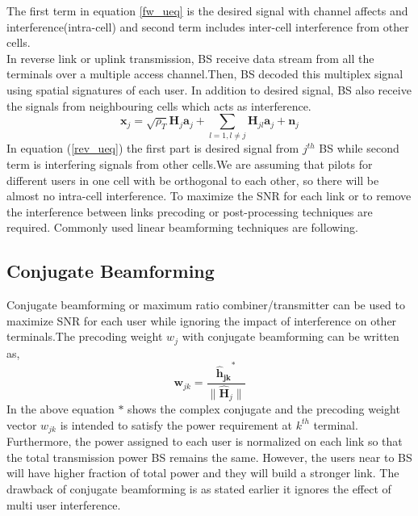  The first term in equation \ref{fw_ueq} is the desired signal with channel affects and interference(intra-cell) and second term includes inter-cell interference from other cells.\\
 In reverse link or uplink transmission, BS receive data stream from all the terminals over a multiple access channel.Then, BS decoded this multiplex signal using  spatial signatures of each user. In addition to desired signal, BS also receive the signals from neighbouring cells which acts as interference.
 \begin{equation}
    \mathbf{x}_j=\sqrt{\rho_T}\mathbf{H}_j \mathbf{a}_j+\sum_{l=1,l\neq j} \mathbf{H}_{jl} \mathbf{a}_j+\mathbf{n}_j
    \label{rev_ueq}
 \end{equation}
 In equation (\ref{rev_ueq}) the first part is desired signal from $j^{th}$ BS while second term is interfering signals from other cells.We are assuming that pilots for different users in one cell with be orthogonal to each other, so there will be almost no intra-cell interference. 
 To maximize the SNR for each link or to remove the interference between links precoding or post-processing techniques are required. Commonly used linear beamforming techniques are following.
 \subsection{Conjugate Beamforming}
 Conjugate beamforming or maximum ratio combiner/transmitter can be used to maximize SNR for each user while ignoring the impact of interference on other terminals.The precoding weight $w_j$ with conjugate beamforming can be written as,
 \begin{equation}
     \mathbf{w}_{jk}=\frac{\mathbf{\hat{h}_{jk}}^*}{\|\mathbf{\hat{H}}_j\|}
     \label{mrc_w} 
 \end{equation}
 In the above equation $*$  shows the complex conjugate and the precoding weight vector $w_{jk}$ is intended to satisfy the  power requirement at $k^{th}$ terminal. Furthermore, the power assigned to each user is normalized on each link so that the total transmission power BS remains the same. However, the users near to BS will have higher fraction of total power and they will build a stronger link.
 The drawback of conjugate beamforming is as stated earlier it ignores the effect of  multi user interference.
